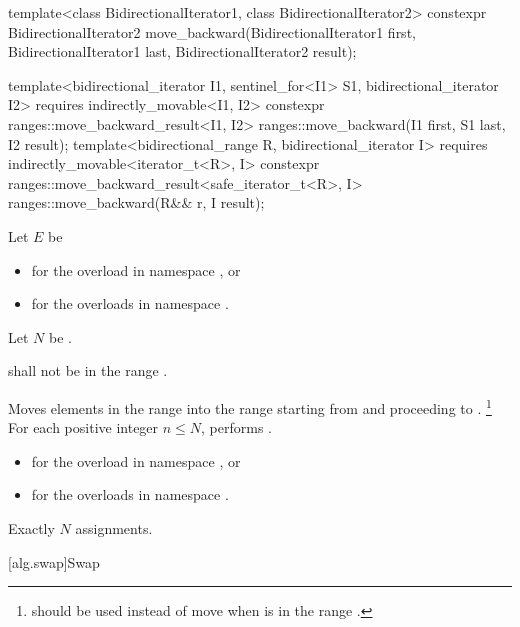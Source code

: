 %
\begin{itemdecl}
template<class BidirectionalIterator1, class BidirectionalIterator2>
  constexpr BidirectionalIterator2
    move_backward(BidirectionalIterator1 first, BidirectionalIterator1 last,
                  BidirectionalIterator2 result);

template<bidirectional_iterator I1, sentinel_for<I1> S1, bidirectional_iterator I2>
  requires indirectly_movable<I1, I2>
  constexpr ranges::move_backward_result<I1, I2>
    ranges::move_backward(I1 first, S1 last, I2 result);
template<bidirectional_range R, bidirectional_iterator I>
  requires indirectly_movable<iterator_t<R>, I>
  constexpr ranges::move_backward_result<safe_iterator_t<R>, I>
    ranges::move_backward(R&& r, I result);
\end{itemdecl}

\begin{itemdescr}
\pnum
Let $E$ be
\begin{itemize}
\item
  for the overload in namespace , or
\item
  for the overloads in namespace .
\end{itemize}
Let $N$ be .

\pnum
\requires
{} shall not be in the range .

\pnum
\effects
Moves elements in the range 
into the range 
starting from  and proceeding to .%
\footnote{ should be used instead of move
when  is in the range .}
For each positive integer $n \le N$,
performs .

\pnum
\returns
\begin{itemize}
\item
  for the overload in namespace , or
\item
  for the overloads in namespace .
\end{itemize}

\pnum
\complexity
Exactly $N$ assignments.
\end{itemdescr}

[alg.swap]{Swap}


